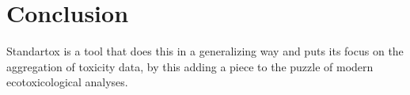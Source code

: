 \section{Conclusion}

Standartox is a tool that does this in a generalizing way and puts its focus on the aggregation of toxicity data, by this adding a piece to the puzzle of modern ecotoxicological analyses.